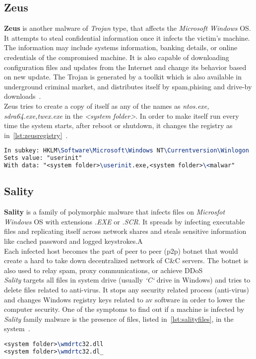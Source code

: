 \subsection{Zeus}
\label{sub:Zeus}
\textbf{Zeus} is another malware of \emph{Trojan} type, that affects the \emph{Microsoft Windows} OS\@.
It attempts to steal confidential information once it infects the victim's machine.
The information may include systems information, banking details, or online credentials of the compromised machine.
It is also capable of downloading configuration files and updates from the Internet and change its behavior based on new update.
The Trojan is generated by a toolkit which is also available in underground criminal market, and distributes itself by spam,phising and drive-by downloads~\cite[Trojan.Zbot]{zeus}.\\
Zeus tries to create a copy of itself as any of the names as \emph{ntos.exe, sdra64.exe,twex.exe} in the \textit{<system folder>}.
In order to make itself run every time the system starts, after reboot or shutdown, it changes the registry as in~\autoref{lst:zeusregistry}~\cite[Win32/Zbot]{zeusmicro}.
\begin{lstlisting}[language=TeX,caption={Registry key modified by Zeus Trojan to autostart},label={lst:zeusregistry}]
In subkey: HKLM\Software\Microsoft\Windows NT\Currentversion\Winlogon
Sets value: "userinit"
With data: "<system folder>\userinit.exe,<system folder>\<malwar"
\end{lstlisting}
\subsection{Sality}
\label{sub:Sality}
\textbf{Sality} is a family of polymorphic malware that infects files on \emph{Microsfot Windows} OS with extensions \emph{.EXE} or \emph{.SCR}.
It spreads by infecting executable files and replicating itself across network shares and steals sensitive information like cached password and logged keystrokes.A\\
Each infected host becomes the part of peer to peer (p2p) botnet that would create a hard to take down decentralized network of C\&C servers.
The botnet is also used to relay spam, proxy communications, or achieve DDoS~\cite[Sality]{salitysym}\\
\emph{Sality} targets all files in system drive (usually \emph{`C`} drive in Windows) and tries to delete files related to anti-virus.
It stops any security related process (anti-virus) and changes Windows registry keys related to av software in order to lower the computer security.
One of the symptoms to find out if a machine is infected by \emph{Sality} family malware is the presence of files, listed in~\autoref{lst:salityfiles}, in the system~\cite[Win32/Sality]{salitymicro}.
\begin{lstlisting}[language=TeX,caption={Files created by Sality in the infected machine},label={lst:salityfiles}]
<system folder>\wmdrtc32.dll
<system folder>\wmdrtc32.dl_
\end{lstlisting}
